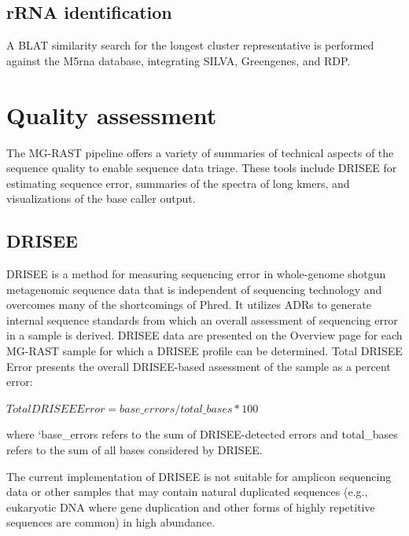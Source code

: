 \documentclass[12pt,fullpage]{report}
\begin{document}
\subsection{rRNA identification}
 A BLAT similarity search for the longest cluster representative is performed against the M5rna database, integrating SILVA\cite{SILVA}, Greengenes\cite{GREENGENES}, and RDP\cite{RDP}.


\section{Quality assessment}
\label{secton:Quality}
The MG-RAST pipeline offers a variety of summaries of technical aspects of the sequence quality to enable sequence data triage.  These tools include DRISEE for estimating sequence error, summaries of the spectra of long kmers, and visualizations of the base caller output.

\subsection{DRISEE}
\label{DRISEEDETAIL}

DRISEE \cite{DRISEE} is a method for measuring sequencing error in whole-genome shotgun metagenomic sequence data that is independent of sequencing technology and overcomes many of the shortcomings of Phred. It utilizes ADRs 
to generate internal sequence standards from which an overall assessment of sequencing error in a sample is derived.
DRISEE data are presented on the Overview page for each MG-RAST sample for which a DRISEE profile can be determined.
Total DRISEE Error presents the overall DRISEE-based assessment of the sample as a percent error:

\begin{small}
\begin{math}
Total DRISEE Er ror = base\_errors/total\_bases * 100
\end{math}
\end{small}
where `base\_errors refers to the sum of DRISEE-detected errors and total\_bases refers to the sum of all bases considered by DRISEE.

The current implementation of DRISEE is not suitable for amplicon sequencing data or other samples that may contain natural duplicated sequences (e.g., eukaryotic DNA where gene duplication and other forms of highly repetitive sequences are common) in high abundance.
\end{document}
